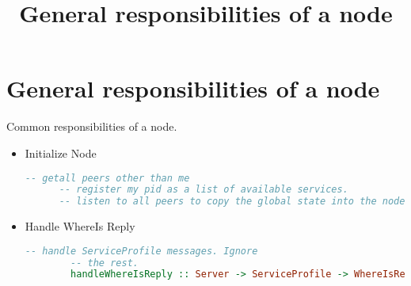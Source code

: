 \documentclass[11pt, twoside, a4paper]{article}
\begin{document}
\title{General responsibilities of a node}
\section {General responsibilities of a node}
Common responsibilities of a node.
\begin{itemize}
  \item Initialize Node 
    \begin{lstlisting}[language=Haskell]
      -- getall peers other than me 
      -- register my pid as a list of available services.
      -- listen to all peers to copy the global state into the node.
    \end{lstlisting}
  \item Handle WhereIs Reply
    \begin{lstlisting}[language=Haskell]
        -- handle ServiceProfile messages. Ignore
        -- the rest.
        handleWhereIsReply :: Server -> ServiceProfile -> WhereIsReply -> Process ()

    \end{lstlisting}

\end{itemize}
\end{document}
